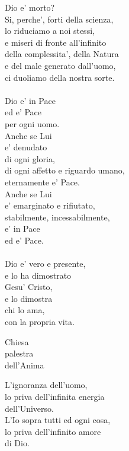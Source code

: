 \begin{haiku}
    Dio e' morto?\\
    Si, perche', forti della scienza,\\
    lo riduciamo a noi stessi,\\
    e miseri di fronte all'infinito\\
    della complessita', della Natura\\
    e del male generato dall'uomo,\\
    ci duoliamo della nostra sorte.\\
    \leavevmode\\
    Dio e' in Pace\\
    ed e' Pace\\
    per ogni uomo.\\
    Anche se Lui\\
    e' denudato\\
    di ogni gloria,\\
    di ogni affetto e riguardo umano,\\
    eternamente e' Pace.\\
    Anche se Lui\\
    e' emarginato e rifiutato,\\
    stabilmente, incessabilmente,\\
    e' in Pace\\
    ed e' Pace.\\
    \leavevmode\\
    Dio e' vero e presente,\\
    e lo ha dimostrato\\
    Gesu' Cristo,\\
    e lo dimostra\\
    chi lo ama,\\
    con la propria vita.\\
\end{haiku}

\begin{haiku}
    Chiesa\\
    palestra\\
    dell'Anima\\
\end{haiku}

\begin{haiku}
    L'ignoranza dell'uomo,\\
    lo priva dell'infinita energia\\
    dell'Universo.\\

    L'Io sopra tutti ed ogni cosa,\\
    lo priva dell'infinito amore\\
    di Dio.\\
\end{haiku}
